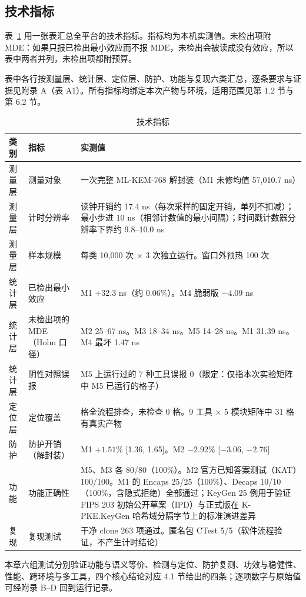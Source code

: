 \subsection{技术指标}

表~\ref{tab:metrics} 用一张表汇总全平台的技术指标。指标均为本机实测值。未检出项附 MDE：如果只报已检出最小效应而不报 MDE，未检出会被读成没有效应，所以表中两者并列，未检出项都附预算。

表中各行按测量层、统计层、定位层、防护、功能与复现六类汇总，逐条要求与证据见附录 A（表 A1）。所有指标均绑定本次产物与环境，适用范围见第 1.2 节与第 6.2 节。

\begin{table}[H]
\centering
\caption{技术指标}
\label{tab:metrics}
{\scriptsize
\begin{tabularx}{\textwidth}{|>{\raggedright\arraybackslash}p{1.6cm}|>{\raggedright\arraybackslash}p{3.0cm}|>{\raggedright\arraybackslash}X|}
\hline
类别 & 指标 & 实测值 \\
\hline
测量层 & 测量对象 & 一次完整 ML-KEM-768 解封装（M1 未修均值 57,010.7 ns） \\
\hline
测量层 & 计时分辨率 & 读钟开销约 17.4 ns（每次采样的固定开销，单列不扣减）；最小步进 10 ns（相邻计数值的最小间隔）；时间戳计数器分辨率下界约 9.8--10.0 ns \\
\hline
测量层 & 样本规模 & 每类 10,000 次 × 3 次独立运行。窗口外预热 100 次 \\
\hline
统计层 & 已检出最小效应 & M1 +32.3 ns（约 0.06\%）。M4 脆弱版 $-4.09$ ns \\
\hline
统计层 & 未检出项的 MDE（Holm 口径） & M2 25--67 ns。M3 18--34 ns。M5 14--28 ns。M1 31.39 ns。M4 最坏 1.47 ns \\
\hline
统计层 & 阴性对照误报 & M5 上运行过的 7 种工具误报 0（限定：仅指本次实验矩阵中 M5 已运行的格子） \\
\hline
定位层 & 定位覆盖 & 90 格全流程排查，未检查 0 格。9 工具 × 5 模块矩阵中 31 格有真实产物 \\
\hline
防护 & 防护开销（解封装） & M1 $+1.51\%$ [1.36, 1.65]。M2 $-2.92\%$ [$-3.06$, $-2.76$] \\
\hline
功能 & 功能正确性 & M5、M3 各 80/80（100\%）。M2 官方已知答案测试（KAT）100/100。M1 的 Encaps 25/25（100\%）、Decaps 10/10（100\%，含隐式拒绝）全部通过；KeyGen 25 例用于验证 FIPS 203 初始公开草案（IPD）与正式版在 K-PKE.KeyGen 哈希域分隔字节上的标准演进差异 \\
\hline
复现 & 复现测试 & 干净 clone 263 项通过。匿名包 CTest 5/5（软件流程验证，不产生计时结论） \\
\hline
\end{tabularx}
}
\end{table}

本章六组测试分别验证功能与语义等价、检测与定位、防护复测、功效与稳健性、性能、跨环境与多工具，四个核心结论对应 4.1 节给出的四条；逐项数字与原始值可经附录 B--D 回到运行记录。
